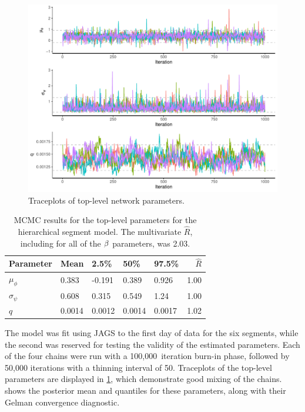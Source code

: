 \begin{knitrout}\small
{}\color{fgcolor}\begin{figure}

{\centering \includegraphics[width=\textwidth]{figure/nw_model_n2_diag-1} 

}

\caption[Traceplots of top-level network parameters]{Traceplots of top-level network parameters.}\label{fig:nw_model_n2_diag}
\end{figure}


\end{knitrout}


\begin{table}

\caption{\label{tab:nw_model_n2_smry}MCMC results for the top-level parameters for the hierarchical segment model. The multivariate $\hat R$, including for all of the $\beta$ parameters, was 2.03.}
\centering
\begin{tabular}[b]{lllllr}
\toprule
Parameter & Mean & 2.5\% & 50\% & 97.5\% & $\hat R$\\
\midrule
$\mu_\phi$ & 0.383 & -0.191 & 0.389 & 0.926 & 1.00\\
$\sigma_\psi$ & 0.608 & 0.315 & 0.549 & 1.24 & 1.00\\
$q$ & 0.0014 & 0.0012 & 0.0014 & 0.0017 & 1.02\\
\bottomrule
\end{tabular}
\end{table}




The model was fit using JAGS to the first day of data for the six segments, while the second was reserved for testing the validity of the estimated parameters. Each of the four chains were run with a 100,000~iteration burn-in phase, followed by 50,000 iterations with a thinning interval of 50. Traceplots of the top-level parameters are displayed in \cref{fig:nw_model_n2_diag}, which demonstrate good mixing of the chains.  shows the posterior mean and quantiles for these parameters, along with their Gelman convergence diagnostic.



